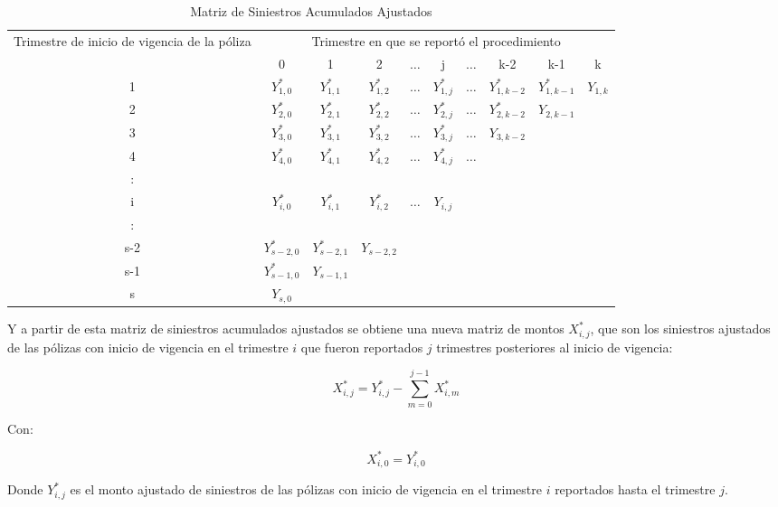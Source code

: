 \documentclass[11pt,twoside,openright,spanish]{report}
\numberwithin{equation}{chapter}
\numberwithin{figure}{chapter}
\numberwithin{table}{chapter}
\begin{document}
	\begin{table}[ht]
		\centering
		\caption{Matriz de Siniestros Acumulados Ajustados}
		\begin{tabularx}{\linewidth}{ c |ccccccccc}
			\multirow{2}{4cm}{Trimestre de inicio de vigencia de la póliza}
			& \multicolumn{9}{c}{Trimestre en que se reportó el procedimiento} \\ 
			& 0  & 1 & 2 & $ \dots $ & j & $\dots $ & k-2 & k-1 &  k \\
			\midrule
			1      &  $Y_{1,0}^{*}$ & $Y_{1,1}^{*}$ & $Y_{1,2}^{*}$ & $ \dots $ & $Y_{1,j}^{*}$ & $ \dots $ & $Y_{1,k-2}^{*}$ & $Y_{1,k-1}^{*}$ & $Y_{1,k}^{}$ \\
			2      &  $Y_{2,0}^{*}$ & $Y_{2,1}^{*}$ & $Y_{2,2}^{*}$ & $ \dots $ & $Y_{2,j}^{*}$ & $ \dots $ & $Y_{2,k-2}^{*}$ & $Y_{2,k-1}^{}$ & \\
			3      &  $Y_{3,0}^{*}$ & $Y_{3,1}^{*}$ & $Y_{3,2}^{*}$ & $ \dots $ & $Y_{3,j}^{*}$ & $ \dots $ & $Y_{3,k-2}^{}$ & & \\
			4      &  $Y_{4,0}^{*}$ & $Y_{4,1}^{*}$ & $Y_{4,2}^{*}$ & $ \dots $ & $Y_{4,j}^{*}$ & $ \dots $ & & & \\
			:      & & & & & & & & & \\
			i      &  $Y_{i,0}^{*}$ & $Y_{i,1}^{*}$ & $Y_{i,2}^{*}$ & $ \dots $ & $Y_{i,j}^{}$ & & & & \\
			:      & & & & & & & & & \\
			s-2      &  $Y_{s-2,0}^{*}$ & $Y_{s-2,1}^{*}$ & $Y_{s-2,2}^{}$ & & & & & & \\
			s-1      &  $Y_{s-1,0}^{*}$ & $Y_{s-1,1}^{}$ & & & & & & & \\
			s      &  $Y_{s,0}^{}$ & & & & & & & & \\
		\end{tabularx}
	\end{table}\label{matrizsiniestrosacumulados}
	
	Y a partir de esta matriz de siniestros acumulados ajustados se obtiene una nueva matriz de montos $X_{i,j}^{*}$, que son los siniestros ajustados de las pólizas con inicio de vigencia en el trimestre $i$ que fueron reportados $j$ trimestres posteriores al inicio de vigencia:
	
	$${X}_{i,j}^{*}={Y}_{i,j}^{*}-\sum _{m=0}^{j-1}{X}_{i,m}^{*}$$	
	 
	Con:
	
	$${X}_{i,0}^{*}={Y}_{i,0}^{*}$$ 
	
	Donde ${Y}_{i,j}^{*}$ es el monto ajustado de siniestros de las pólizas con inicio de vigencia en el trimestre $i$ reportados hasta el trimestre $j$. 
	
\end{document}
